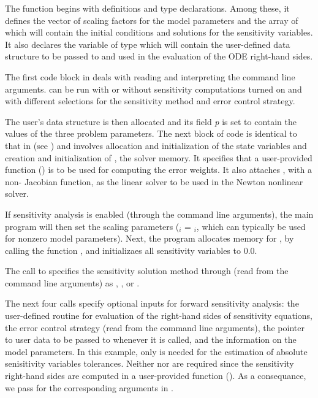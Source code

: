 The  function begins with definitions and type declarations. 
Among these, it defines the vector  of  scaling factors for
the model parameters   and the array  of 
 which will contain the initial conditions and solutions for the sensitivity
variables. It also declares the variable  of type  
which will contain the user-defined data structure to be passed to {\cvodes} and used in the 
evaluation of the ODE right-hand sides.

The first code block in  deals with reading and interpreting the
command line arguments.  can be run with or without sensitivity computations
turned on and with different selections for the sensitivity method and error control strategy.

The user's data structure is then allocated and its field {\em p} is set to contain
the values of the three problem parameters.
The next block of code is identical to that in  (see \cite{cvode2.2.0_ex})
and involves allocation and initialization of the state variables and creation and 
initialization of , the {\cvodes} solver memory. It specifies that
a user-provided function () is to be used for computing the error weights.
It also attaches {\cvdense}, with a non- Jacobian function, as the linear solver 
to be used in the Newton nonlinear solver.

If sensitivity analysis is enabled (through the command line arguments), 
the main program will then set the scaling parameters
 ($_i$ = $_i$, which can typically be used for 
nonzero model parameters). 
Next, the program allocates memory for , by calling the {\nvecs} function 
, and initializaes all sensitivity variables to $0.0$.

The call to  specifies the sensitivity solution method through 
 (read from the command line arguments) as , 
, or .

The next four calls specify optional inputs for forward sensitivity analysis:
the user-defined routine for evaluation of the right-hand
sides of sensitivity equations, the error control strategy
(read from the command line arguments), the pointer to
user data to be passed to  whenever it is called, and  
the information on the model parameters. In this example, only  is needed for the 
estimation of absolute senisitivity variables tolerances. Neither  nor 
are required since the sensitivity right-hand sides are computed in a user-provided
function (). As a consequance, we pass  for the corresponding arguments in
.

